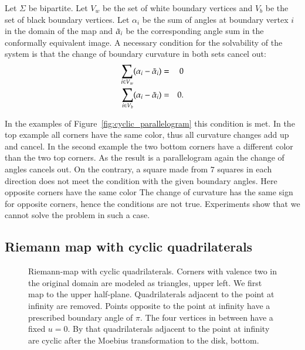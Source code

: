 \documentclass[Thesis]{subfiles}
\begin{document}
\begin{conjecture}
Let $\Sigma$ be bipartite. Let $V_w$ be the set of white boundary vertices and $V_b$ be the set of black boundary vertices.
Let $\alpha_i$ be the sum of angles at boundary vertex $i$ in the domain of the map and $\tilde{\alpha}_i$ be the corresponding angle sum in the conformally equivalent image.
A necessary condition for the solvability of the system is that the change of boundary curvature in both sets cancel out:
\begin{eqnarray}
\sum_{i\in V_w}(\alpha_i - \tilde{\alpha}_i) &=& 0\\
\sum_{i\in V_b}(\alpha_i - \tilde{\alpha}_i) &=& 0.
\end{eqnarray}
\end{conjecture}

In the examples of Figure~\ref{fig:cyclic_parallelogram} this condition is met. 
In the top example all corners have the same color, thus all curvature changes add up and cancel.
In the second example the two bottom corners have a different color than the two top corners.
As the result is a parallelogram again the change of angles cancels out.
On the contrary, a square made from $7$ squares in each direction does not meet the condition with the given boundary angles.
Here opposite corners have the same color
The change of curvature has the same sign for opposite corners, hence the conditions are not true.
Experiments show that we cannot solve the problem in such a case.

\subsection{Riemann map with cyclic quadrilaterals}
\label{sec:riemann_map}

\begin{figure}
\centering
{}
\caption{
Riemann-map with cyclic quadrilaterals.
Corners with valence two in the original domain are modeled as triangles, upper left.
We first map to the upper half-plane.
Quadrilaterals adjacent to the point at infinity are removed.
Points opposite to the point at infinity have a prescribed boundary angle of $\pi$.
The four vertices in between have a fixed $u=0$.
By that quadrilaterals adjacent to the point at infinity are cyclic after the Moebius transformation to the disk, bottom.
}
\label{fig:circular_riemann}
\end{figure}
\end{document}
